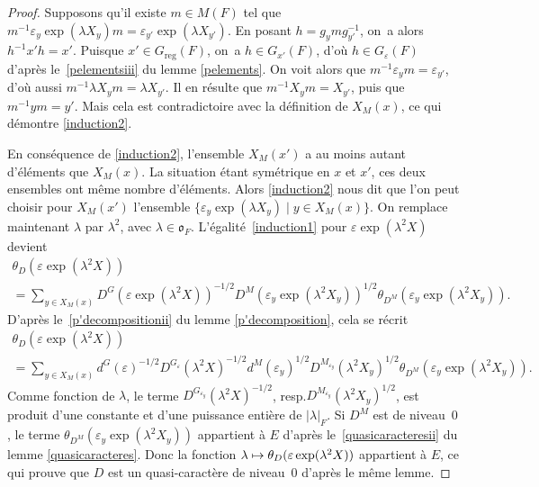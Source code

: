 \documentclass[11pt]{article}
\newcommand{\resp}{resp.\xspace}
\numberwithin{equation}{section}\providecommand{\og}{«\,}\providecommand{\fg}{\,»}
\let\epsilon\varepsilon
\let\sep\mid
\newcommand\mto{\mathchoice{\longmapsto}{\mapsto}{\mapsto}{\mapsto}}
\newcommand{\fro}{\mathfrak{o}}
\newcommand{\reg}{\mathrm{reg}}
\theoremstyle{plain}
\theoremstyle{definition}
\begin{document}
\begin{proof}
Supposons qu'il existe $m\in M(F)$ tel que $m^{-1}\epsilon_{y}\exp(\lambda X_{y})m=\epsilon_{y'}\exp(\lambda X_{y'})$. En posant $h=g_{y}mg_{y'}^{-1}$, on~a alors $h^{-1}x'h=x'$. Puisque $x'\in G_{\reg}(F)$, on~a $h\in G_{x'}(F)$, d'où $h\in G_{\epsilon}(F)$ d'après le~\eqref{pelementsiii} du lemme \ref{pelements}. On voit alors que $m^{-1}\epsilon_{y}m=\epsilon_{y'}$, d'où aussi $m^{-1}\lambda X_{y}m=\lambda X_{y'}$. Il en résulte que $m^{-1}X_{y}m =X_{y'}$, puis que $m^{-1}ym=y'$. Mais cela est contradictoire avec la définition de $X_{M}(x)$, ce qui démontre \eqref{induction2}.

En conséquence de \eqref{induction2}, l'ensemble $X_{M}(x')$ a au moins autant d'éléments que $X_{M}(x)$. La situation étant symétrique en $x$ et $x'$, ces deux ensembles ont même nombre d'éléments. Alors \eqref{induction2} nous dit que l'on peut choisir pour $X_{M}(x')$ l'ensemble $\{\epsilon_{y}\exp(\lambda X_{y})\sep y\in X_{M}(x)\}$. On remplace maintenant $\lambda$ par $\lambda^2$, avec $\lambda\in \fro_{F}$. L'égalité~\eqref{induction1} pour $\epsilon \exp(\lambda^2X)$ devient\vspace*{-5pt}
\begin{multline*}
\theta_{D}(\epsilon \exp(\lambda^2X))\\[-3pt]
=\sum_{y\in X_{M}(x)}D^G(\epsilon \exp(\lambda^2X))^{-1/2}D^M(\epsilon_{y}\exp(\lambda^2X_{y}))^{1/2}\theta_{D^M}(\epsilon_{y}\exp(\lambda^2X_{y})).
\end{multline*}
D'après le~\eqref{p'decompositionii} du lemme \ref{p'decomposition}, cela se récrit\vspace*{-5pt}
\begin{multline*}
\theta_{D}(\epsilon \exp(\lambda^2X))\\[-3pt]
=\sum_{y\in X_{M}(x)}d^G(\epsilon)^{-1/2}D^{G_{\epsilon}}(\lambda^2X)^{-1/2} d^M(\epsilon_{y})^{1/2}D^{M_{\epsilon_{y}}}(\lambda^2X_{y})^{1/2}\theta_{D^M}(\epsilon_{y}\exp(\lambda^2X_{y})).
\end{multline*}
Comme fonction de $\lambda$, le terme $D^{G_{\epsilon_{y}}}(\lambda^2X)^{-1/2}$, \resp $D^{M_{\epsilon_{y}}}(\lambda^2X_{y})^{1/2}$, est produit d'une constante et d'une puissance entière de $\vert \lambda\vert _{F}$. Si $D^M$ est de niveau~$0$, le terme $ \theta_{D^M}(\epsilon_{y}\exp(\lambda^2X_{y}))$ appartient à $E$ d'après le~\eqref{quasicaracteresii} du lemme \ref{quasicaracteres}. Donc la fonction $\lambda\mto \theta_{D}(\epsilon \exp(\lambda^2X))$ appartient à $E$, ce qui prouve que $D$ est un quasi-caractère de niveau~$0$ d'après le même lemme.
\end{proof}
\end{document}
